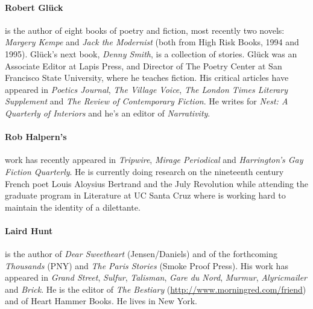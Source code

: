 \documentclass[
]{memoir}
\begin{document}
\hypertarget{robert-gluxfcck}{%
\paragraph{Robert Glück}\label{robert-gluxfcck}}

is the author of eight books of poetry and fiction, most recently two
novels: \emph{Margery Kempe} and \emph{Jack the Modernist} (both from
High Risk Books, 1994 and 1995). Glück's next book, \emph{Denny Smith},
is a collection of stories. Glück was an Associate Editor at Lapis
Press, and Director of The Poetry Center at San Francisco State
University, where he teaches fiction. His critical articles have
appeared in \emph{Poetics Journal}, \emph{The Village Voice}, \emph{The
London Times Literary Supplement} and \emph{The Review of Contemporary
Fiction}. He writes for \emph{Nest: A Quarterly of Interiors} and he's
an editor of \emph{Narrativity}.

\hypertarget{rob-halperns}{%
\paragraph{Rob Halpern's}\label{rob-halperns}}

work has recently appeared in \emph{Tripwire}, \emph{Mirage Periodical}
and \emph{Harrington's Gay Fiction Quarterly}. He is currently doing
research on the nineteenth century French poet Louis Aloysius Bertrand
and the July Revolution while attending the graduate program in
Literature at UC Santa Cruz where is working hard to maintain the
identity of a dilettante.

\hypertarget{laird-hunt}{%
\paragraph{Laird Hunt}\label{laird-hunt}}

is the author of \emph{Dear Sweetheart} (Jensen/Daniels) and of the
forthcoming \emph{Thousands} (PNY) and \emph{The Paris Stories} (Smoke
Proof Press). His work has appeared in \emph{Grand Street},
\emph{Sulfur}, \emph{Talisman}, \emph{Gare du Nord}, \emph{Murmur},
\emph{Alyricmailer} and \emph{Brick}. He is the editor of \emph{The
Bestiary}
(\href{\%3Cfont\%20face=http://www.morning\%20red.com/friend}{http://www.morningred.com/friend})
and of Heart Hammer Books. He lives in New York.
\end{document}
